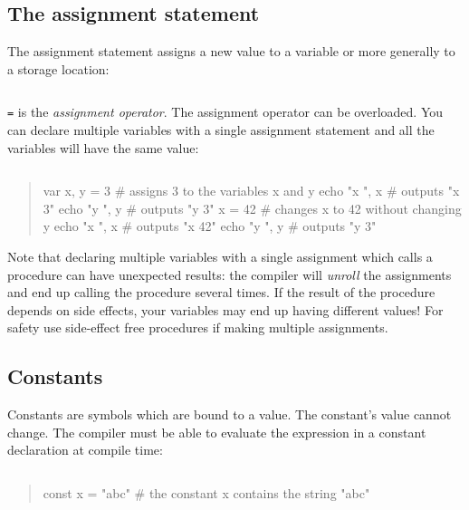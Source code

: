 \hypertarget{the-assignment-statement}{%
\subsection{The assignment statement}\label{the-assignment-statement}}

The assignment statement assigns a new value to a variable or more
generally to a storage location:

\begin{verbatim}
\end{verbatim}

\texttt{=} is the \emph{assignment operator}. The assignment operator
can be overloaded. You can declare multiple variables with a single
assignment statement and all the variables will have the same value:

\begin{verbatim}
\end{verbatim}

\begin{quote}
var x, y = 3 \# assigns 3 to the variables {x} and {y} echo "x ", x \#
outputs "x 3" echo "y ", y \# outputs "y 3" x = 42 \# changes {x} to 42
without changing {y} echo "x ", x \# outputs "x 42" echo "y ", y \#
outputs "y 3"
\end{quote}

Note that declaring multiple variables with a single assignment which
calls a procedure can have unexpected results: the compiler will
\emph{unroll} the assignments and end up calling the procedure several
times. If the result of the procedure depends on side effects, your
variables may end up having different values! For safety use side-effect
free procedures if making multiple assignments.

\hypertarget{constants}{%
\subsection{Constants}\label{constants}}

Constants are symbols which are bound to a value. The constant's value
cannot change. The compiler must be able to evaluate the expression in a
constant declaration at compile time:

\begin{verbatim}
\end{verbatim}

\begin{quote}
const x = "abc" \# the constant x contains the string "abc"
\end{quote}

